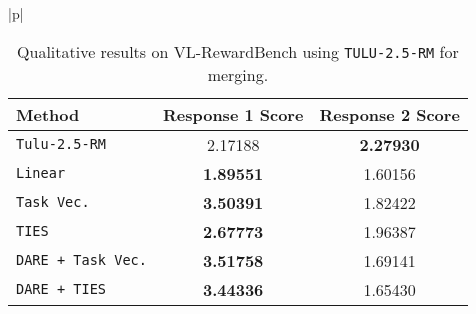 \begin{table*}[hbtp]
\begin{center}
\begin{tabular}{|p{\textwidth}|}
\begin{center}
\begin{tabular}{|l|c|c|}
                \hline
                \textbf{Method} & \textbf{Response 1 Score} & \textbf{Response 2 Score} \\
                \hline
                \texttt{Tulu-2.5-RM} & 2.17188 & \textbf{2.27930} \\
                \texttt{Linear} & \textbf{1.89551} & 1.60156 \\
                \texttt{Task Vec.} & \textbf{3.50391} & 1.82422 \\
                \texttt{TIES} & \textbf{2.67773} & 1.96387 \\
                \texttt{DARE + Task Vec.} & \textbf{3.51758} & 1.69141 \\
                \texttt{DARE + TIES} & \textbf{3.44336} & 1.65430 \\
                \hline
            \end{tabular} \\
        \end{center} \\
        \hline
        \end{tabular}
    \end{center}
    \caption{Qualitative results on VL-RewardBench using \texttt{TULU-2.5-RM} for merging.} 
    \label{tab:qualitative_results}
\end{table*}